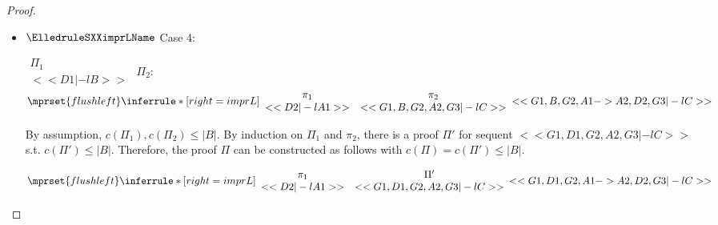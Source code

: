 \begin{proof}
\begin{enumerate}
\begin{itemize}
  \item $\ElledruleSXXimprLName$ Case 4:
      \begin{center}
        \scriptsize
        \begin{math}
          \begin{array}{c}
            \Pi_1 \\
            {<<D1 |-l B>>}
          \end{array}
        \end{math}
        \qquad\qquad
        $\Pi_2$:
        \begin{math}
          $$\mprset{flushleft}
          \inferrule* [right={\tiny imprL}] {
            {
              \begin{array}{cc}
                \pi_1 & \pi_2 \\
                {<<D2 |-l A1>>} & {<<G1, B, G2, A2, G3 |-l C>>}
              \end{array}
            }
          }{<<G1, B, G2, A1 -> A2, D2, G3 |-l C>>}
        \end{math}
      \end{center}
      By assumption, $c(\Pi_1),c(\Pi_2)\leq |B|$. By induction on $\Pi_1$ and $\pi_2$, there is
      a proof $\Pi'$ for sequent $<<G1, D1, G2, A2, G3 |-l C>>$ s.t. $c(\Pi') \leq |B|$.
      Therefore, the proof $\Pi$ can be constructed as follows with
      $c(\Pi) = c(\Pi') \leq |B|$.
      \begin{center}
        \scriptsize
        \begin{math}
          $$\mprset{flushleft}
          \inferrule* [right={\tiny imprL}] {
            {
              \begin{array}{cc}
                \pi_1 & \Pi' \\
                {<<D2 |-l A1>>} & {<<G1, D1, G2, A2, G3 |-l C>>}
              \end{array}
            }
          }{<<G1, D1, G2, A1 -> A2, D2, G3 |-l C>>}
        \end{math}
      \end{center}


\end{itemize}
\end{enumerate}
\end{proof}
